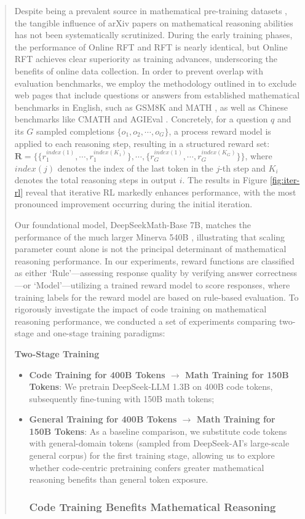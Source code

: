 \begin{abstract}
Despite being a prevalent source in mathematical pre-training datasets \citep{minerva,gpt-f,llemma,mathpile}, the tangible influence of arXiv papers on mathematical reasoning abilities has not been systematically scrutinized. During the early training phases, the performance of Online RFT and RFT is nearly identical, but Online RFT achieves clear superiority as training advances, underscoring the benefits of online data collection. In order to prevent overlap with evaluation benchmarks, we employ the methodology outlined in \cite{deepseek-coder} to exclude web pages that include questions or answers from established mathematical benchmarks in English, such as GSM8K \citep{gsm8k} and MATH \citep{MATH}, as well as Chinese benchmarks like CMATH \citep{wei2023cmath} and AGIEval \citep{agieval}. Concretely, for a question $q$ and its $G$ sampled completions $\{o_1, o_2, \cdots, o_G\}$, a process reward model is applied to each reasoning step, resulting in a structured reward set: $\mathbf{R} = \{ \{r_1^{index(1)},\cdots,r_1^{index(K_1)}\}, \cdots,  \{r_G^{index(1)},\cdots,r_G^{index(K_G)}\} \}$, where $index(j)$ denotes the index of the last token in the $j$-th step and $K_i$ denotes the total reasoning steps in output $i$. The results in Figure \ref{fig:iter-rl} reveal that iterative RL markedly enhances performance, with the most pronounced improvement occurring during the initial iteration. \item Our foundational model, DeepSeekMath-Base 7B, matches the performance of the much larger Minerva 540B \citep{minerva}, illustrating that scaling parameter count alone is not the principal determinant of mathematical reasoning performance. In our experiments, reward functions are classified as either ‘Rule’—assessing response quality by verifying answer correctness—or ‘Model’—utilizing a trained reward model to score responses, where training labels for the reward model are based on rule-based evaluation. To rigorously investigate the impact of code training on mathematical reasoning performance, we conducted a set of experiments comparing two-stage and one-stage training paradigms:

\textbf{Two-Stage Training}

\begin{itemize}[topsep=0pt]
    \item \textbf{Code Training for 400B Tokens $\rightarrow$ Math Training for 150B Tokens}: We pretrain DeepSeek-LLM 1.3B on 400B code tokens, subsequently fine-tuning with 150B math tokens;
    \item \textbf{General Training for 400B Tokens $\rightarrow$ Math Training for 150B Tokens}: As a baseline comparison, we substitute code tokens with general-domain tokens (sampled from DeepSeek-AI’s large-scale general corpus) for the first training stage, allowing us to explore whether code-centric pretraining confers greater mathematical reasoning benefits than general token exposure. \subsubsection{Code Training Benefits Mathematical Reasoning}


\end{itemize}
\end{abstract}
